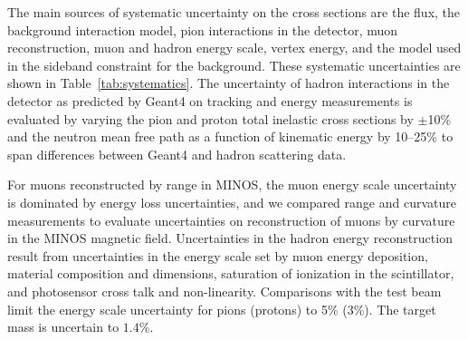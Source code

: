 \documentclass[aps,prl,twocolumn,showpacs,superscriptaddress,nofootinbib]{revtex4}
\newcommand{\minerva}{MINERvA\xspace}
\begin{document}
 
The main sources of systematic uncertainty on the cross sections are the
flux, the background interaction model, pion interactions in the detector, muon
reconstruction, muon and hadron energy scale, vertex energy, and the
model used in the sideband constraint for the background.
These systematic uncertainties are shown in Table~\ref{tab:systematics}.
The uncertainty of hadron interactions in the detector as predicted by Geant4 on tracking and energy measurements is evaluated
by varying the pion and proton
total inelastic cross sections by $\pm$10\% and the neutron mean free path as a function of kinematic energy
by 10--25\% to span differences between Geant4 and hadron scattering data\cite{Ashery:1981tq,Allardyce:1973ce,Saunders:1996ic,Lee:2002eq,Abfalterer:2001gw,Schimmerling:1973bb,Voss:1956,Slypen:1995fm,Franz:1989cf,Tippawan:2008xk,Bevilacqua:2013rfq,Zanelli:1981zz}.

%
For muons reconstructed by range in MINOS, the muon energy scale uncertainty is
dominated by energy loss uncertainties, and
we compared range and curvature measurements to evaluate uncertainties
on reconstruction of muons by curvature in the MINOS magnetic field.  
Uncertainties in the hadron energy reconstruction result from uncertainties in the energy scale set
by muon energy deposition, material composition and dimensions, saturation of
ionization in the scintillator, and photosensor cross talk and non-linearity.
Comparisons with the test beam\cite{minerva_nim} limit the energy scale uncertainty for
pions (protons) to 5\% (3\%).  
The target mass is uncertain to $1.4$\%.
\end{document}

